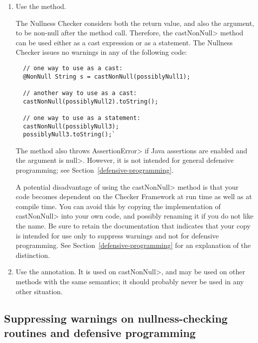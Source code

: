 \begin{enumerate}
\item
  Use the  method.

The Nullness
 Checker considers both the return value, and also the argument, to
 be non-null after the method call.  Therefore, the
 \<castNonNull> method can be used either as a cast expression or
 as a statement.  The Nullness Checker issues no warnings in any of
the following code:

\begin{Verbatim}
  // one way to use as a cast:
  @NonNull String s = castNonNull(possiblyNull1);

  // another way to use as a cast:
  castNonNull(possiblyNull2).toString();

  // one way to use as a statement:
  castNonNull(possiblyNull3);
  possiblyNull3.toString();`
\end{Verbatim}

  The method also throws \<AssertionError> if Java assertions are enabled and
  the argument is \<null>.  However, it is not intended for general defensive
  programming; see Section~\ref{defensive-programming}.

  A potential disadvantage of using the \<castNonNull> method is that your
  code becomes dependent on the Checker Framework at run time as well as at
  compile time.  You can avoid this by copying the implementation of
  \<castNonNull> into your own code, and possibly renaming it if you do not
  like the name.  Be sure to retain the documentation that indicates that
  your copy is intended for use only to suppress warnings and not for
  defensive programming.  See Section~\ref{defensive-programming} for an
  explanation of the distinction.

\item
  Use the 
  annotation.  It is used on \<castNonNull>, and may be used on other
  methods with the same semantics; it should probably never be used in any
  other situation.

\end{enumerate}


\subsection{Suppressing warnings on nullness-checking routines and defensive programming\label{defensive-programming}}

